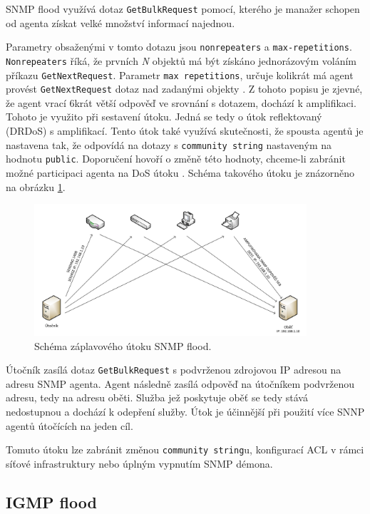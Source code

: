 SNMP flood využívá dotaz \texttt{GetBulkRequest} pomocí, kterého je manažer schopen od agenta získat velké množství informací najednou.

Parametry obsaženými v tomto dotazu jsou \texttt{nonrepeaters} a \texttt{max-repetitions}. \texttt{Nonrepeaters} říká, že prvních \textit{N} objektů má být získáno jednorázovým voláním příkazu \texttt{GetNextRequest}. Parametr \texttt{max repetitions}, určuje kolikrát má agent provést \texttt{GetNextRequest} dotaz nad zadanými objekty \cite{Kukla2010}. Z tohoto popisu je zjevné, že agent vrací  6krát větší odpověď ve srovnání s dotazem, dochází k amplifikaci. Tohoto je využito při sestavení útoku. Jedná se tedy o útok reflektovaný (DRDoS) s amplifikací. Tento útok také využívá skutečnosti, že spousta agentů je nastavena tak, že odpovídá na dotazy s \texttt{community string} nastaveným na hodnotu \texttt{public}. Doporučení hovoří o změně této hodnoty, chceme-li zabránit možné participaci agenta na DoS útoku \cite{Stange-snmp-amplification}. Schéma takového útoku je znázorněno na obrázku \ref{fig:snmp-flood-schema}.


\begin{figure}[!h]
	\begin{center}
		\includegraphics[width=0.9\textwidth]{obrazky/snmp_flood_schema.png}
	\end{center}
	\caption{Schéma záplavového útoku SNMP flood.}
	\label{fig:snmp-flood-schema}
\end{figure}

Útočník zasílá dotaz \texttt{GetBulkRequest} s podvrženou zdrojovou IP adresou na adresu SNMP agenta. Agent následně zasílá odpověď na útočníkem podvrženou adresu, tedy na adresu oběti. Služba jež poskytuje oběť se tedy stává nedostupnou a dochází k odepření služby. 
Útok je účinnější při použití více SNNP agentů útočících na jeden cíl.

Tomuto útoku lze zabránit změnou \texttt{community string}u, konfigurací ACL v rámci síťové infrastruktury nebo úplným vypnutím SNMP démona.

\subsection{IGMP flood}
\label{subsec:igmp_flood}

 
